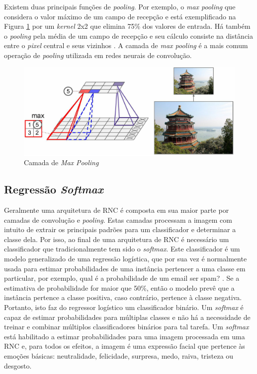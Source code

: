 Existem duas principais funções de \textit{pooling}. Por exemplo, o \textit{max pooling} que considera o valor máximo de um campo de recepção e está exemplificado na Figura \ref{fig:pool} por um \textit{kernel} 2x2 que elimina 75\% dos valores de entrada. Há também o \textit{pooling} pela média de um campo de recepção e seu cálculo consiste na distância entre o \textit{pixel} central e seus vizinhos \citep{goodfellow2016deep}. A camada de \textit{max pooling} é a mais comum operação de \textit{pooling} utilizada em redes neurais de convolução.


\begin{figure}
\centering
\includegraphics[scale=0.45]{figuras/pool.png}
\caption{Camada de \textit{Max Pooling}}
\label{fig:pool}
\end{figure}


\subsection{Regressão \textit{Softmax}}
Geralmente uma arquitetura de RNC é composta em sua maior parte por camadas de convolução e \textit{pooling}. Estas camadas processam a imagem com intuito de extrair os principais padrões para um classificador e determinar a classe dela. Por isso, ao final de uma arquitetura de RNC é necessário um classificador que tradicionalmente tem sido o \textit{softmax}. Este classificador é um modelo generalizado de uma regressão logística, que por sua vez é normalmente usada para estimar probabilidades de uma instância pertencer a uma classe em particular, por exemplo, qual é a probabilidade de um email ser spam? \citep{geron2017hands}. Se a estimativa de probabilidade for maior que 50\%, então o modelo prevê que a instância pertence a classe positiva, caso contrário, pertence à classe negativa. Portanto, isto faz do regressor logístico um classificador binário. Um \textit{softmax} é capaz de estimar probabilidades para múltiplas classes e não há a necessidade de treinar e combinar múltiplos classificadores binários para tal tarefa. Um \textit{softmax} está habilitado a estimar probabilidades para uma imagem processada em uma RNC e, para todos os efeitos, a imagem é uma expressão facial que pertence às emoções básicas: neutralidade, felicidade, surpresa, medo, raiva, tristeza ou desgosto.

